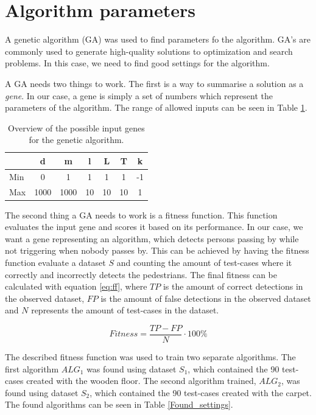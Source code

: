\section{Algorithm parameters}
A genetic algorithm (GA) was used to find parameters fo the algorithm. GA's are commonly used to generate high-quality solutions to optimization and search problems. In this case, we need to find good settings for the algorithm.

A GA needs two things to work. The first is a way to summarise a solution as a \textit{gene}. In our case, a gene is simply a set of numbers which represent the parameters of the algorithm. The range of allowed inputs can be seen in Table \ref{tbl:genes}.

\begin{table}[]
	\centering
	\begin{tabular}{l|cccccc}
		& d & m & l  & L  & T  & k  \\ \hline
		Min & 0 & 1 & 1  & 1  & 1  & -1 \\
		Max & 1000 & 1000 & 10 & 10 & 10 & 1 
	\end{tabular}
	\caption{Overview of the possible input genes for the genetic algorithm.\label{tbl:genes}}
\end{table}

The second thing a GA needs to work is a fitness function. This function evaluates the input gene and scores it based on its performance. In our case, we want a gene representing an algorithm, which detects persons passing by while not triggering when nobody passes by. This can be achieved by having the fitness function evaluate a dataset $S$ and counting the amount of test-cases where it correctly and incorrectly detects the pedestrians. The final fitness can be calculated with equation \ref{eq:ff}, where $TP$ is the amount of correct detections in the observed dataset, $FP$ is the amount of false detections in the observed dataset and $N$ represents the amount of test-cases in the dataset.

\begin{equation}
	Fitness = \frac{TP - FP}{N} \cdot 100\%
	\label{eq:ff}
\end{equation}

The described fitness function was used to train two separate algorithms. The first algorithm $ALG_1$ was found using dataset $S_1$, which contained the 90 test-cases created with the wooden floor. The second algorithm trained, $ALG_2$, was found using dataset $S_2$, which contained the 90 test-cases created with the carpet. The found algorithms can be seen in Table \ref{Found_settings}.

